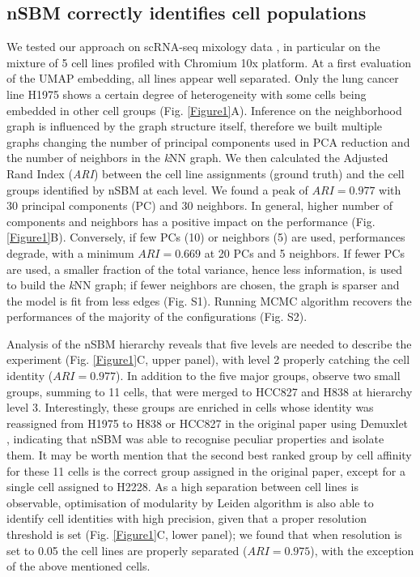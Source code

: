 \documentclass{bmcart}
\begin{document}
\subsection*{nSBM correctly identifies cell populations}
We tested our approach on scRNA-seq mixology data \cite{tian_2019}, in particular on the mixture of 5 cell lines profiled with Chromium 10x platform. At a first evaluation of the UMAP embedding, all lines appear well separated. Only the lung cancer line H1975 shows a certain degree of heterogeneity with some cells being embedded in other cell groups (Fig. \ref{Figure1}A). Inference on the neighborhood graph is influenced by the graph structure itself, therefore we built multiple graphs changing the number of principal components used in PCA reduction and the number of neighbors in the \emph{k}NN graph. We then calculated the Adjusted Rand Index (\emph{ARI}) between the cell line assignments (ground truth) and the cell groups identified by nSBM at each level. We found a peak of $ARI=0.977$ with 30 principal components (PC) and 30 neighbors. In general, higher number of components and neighbors has a positive impact on the performance (Fig. \ref{Figure1}B). Conversely, if few PCs (10) or neighbors (5) are used, performances degrade, with a minimum $ARI=0.669$ at 20 PCs and 5 neighbors. If fewer PCs are used, a smaller fraction of the total variance, hence less information, is used to build the \emph{k}NN graph; if fewer neighbors are chosen, the graph is sparser and the model is fit from less edges (Fig. S1). Running MCMC algorithm recovers the performances of the majority of the configurations (Fig. S2).

Analysis of the nSBM hierarchy reveals that five levels are needed to describe the experiment (Fig. \ref{Figure1}C, upper panel), with level 2 properly catching the cell identity ($ARI = 0.977$). In addition to the five major groups, observe two small groups, summing to 11 cells, that were merged to HCC827 and H838 at hierarchy level 3. Interestingly, these groups are enriched in cells whose identity was reassigned from H1975 to H838 or HCC827 in the original paper using Demuxlet \cite{kang_2018}, indicating that nSBM was able to recognise peculiar properties and isolate them. It may be worth mention that the second best ranked group by cell affinity for these 11 cells is the correct group assigned in the original paper, except for a single cell assigned to H2228.
As a high separation between cell lines is observable, optimisation of modularity by Leiden algorithm is also able to identify cell identities with high precision, given that a proper resolution threshold is set (Fig. \ref{Figure1}C, lower panel); we found that when resolution is set to 0.05 the cell lines are properly separated ($ARI = 0.975$), with the exception of the above mentioned cells.
\end{document}
